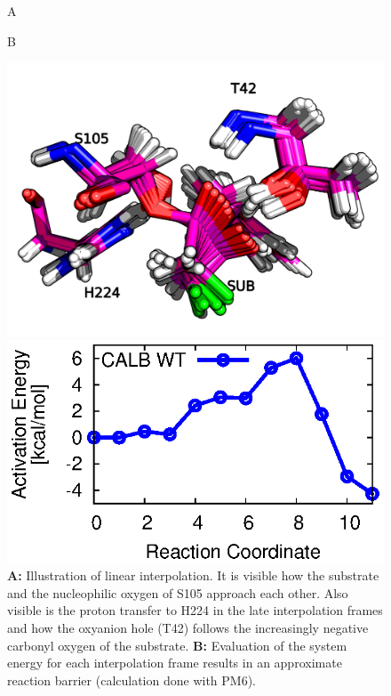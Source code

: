 \begin{figure}[htbp] 
\centering
\begin{minipage}{0.49\linewidth}
A
\end{minipage}
\begin{minipage}{0.49\linewidth}
B
\end{minipage}
\begin{minipage}{0.49\linewidth}
\includegraphics[width=1.00\linewidth]{calb-interpolation-1.png}
\end{minipage}
\begin{minipage}{0.49\linewidth}
\includegraphics[width=1.00\linewidth]{0000-wt.eps}
\end{minipage}
\caption{
\textbf{A:} Illustration of linear interpolation.
It is visible how the substrate and the nucleophilic oxygen of S105 approach each other.
Also visible is the proton transfer to H224 in the late interpolation frames and how the oxyanion hole (T42) follows the increasingly negative carbonyl oxygen of the substrate.
\textbf{B:} Evaluation of the system energy for each interpolation frame results in an approximate reaction barrier (calculation done with PM6).
}
\label{fig:calb_reaction}
\end{figure}
